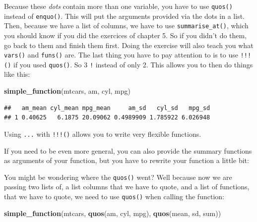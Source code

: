 \documentclass[]{gitbook}
\newenvironment{Shaded}{\begin{snugshade}}{\end{snugshade}}
\newcommand{\ControlFlowTok}[1]{\textcolor[rgb]{0.13,0.29,0.53}{\textbf{#1}}}
\newcommand{\KeywordTok}[1]{\textcolor[rgb]{0.13,0.29,0.53}{\textbf{#1}}}
\newcommand{\NormalTok}[1]{#1}
\newcommand{\OperatorTok}[1]{\textcolor[rgb]{0.81,0.36,0.00}{\textbf{#1}}}
\newcommand{\StringTok}[1]{\textcolor[rgb]{0.31,0.60,0.02}{#1}}
\begin{document}
Because these \emph{dots} contain more than one variable, you have to use \texttt{quos()} instead of \texttt{enquo()}.
This will put the arguments provided via the dots in a list. Then, because we have a list of
columns, we have to use \texttt{summarise\_at()}, which you should know if you did the exercices of
chapter 5. So if you didn't do them, go back to them and finish them first. Doing the exercise will
also teach you what \texttt{vars()} and \texttt{funs()} are. The last thing you have to pay attention to is to
use \texttt{!!!()} if you used \texttt{quos()}. So 3 \texttt{!} instead of only 2. This allows you to then do things
like this:

\begin{Shaded}
\begin{Highlighting}[]
\KeywordTok{simple_function}\NormalTok{(mtcars, am, cyl, mpg)}
\end{Highlighting}
\end{Shaded}

\begin{verbatim}
##   am_mean cyl_mean mpg_mean     am_sd   cyl_sd   mpg_sd
## 1 0.40625   6.1875 20.09062 0.4989909 1.785922 6.026948
\end{verbatim}

Using \texttt{...} with \texttt{!!!()} allows you to write very flexible functions.

If you need to be even more general, you can also provide the summary functions as arguments of
your function, but you have to rewrite your function a little bit:

\begin{Shaded}
\end{Shaded}

You might be wondering where the \texttt{quos()} went? Well because now we are passing two lists of, a list
columns that we have to quote, and a list of functions, that we have to quote, we need to use \texttt{quos()}
when calling the function:

\begin{Shaded}
\begin{Highlighting}[]
\KeywordTok{simple_function}\NormalTok{(mtcars, }\KeywordTok{quos}\NormalTok{(am, cyl, mpg), }\KeywordTok{quos}\NormalTok{(mean, sd, sum))}
\end{Highlighting}
\end{Shaded}
\end{document}
